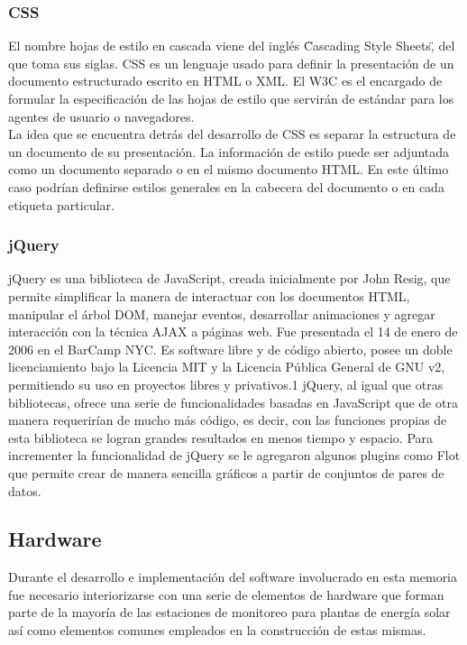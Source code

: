 \subsubsection{CSS}
El nombre hojas de estilo en cascada viene del inglés \"Cascading Style Sheets\", del que toma sus siglas. CSS es un lenguaje usado para definir la presentación de un documento estructurado escrito en HTML o XML. El W3C es el encargado de formular la especificación de las hojas de estilo que servirán de estándar para los agentes de usuario o navegadores.\\
La idea que se encuentra detrás del desarrollo de CSS es separar la estructura de un documento de su presentación. La información de estilo puede ser adjuntada como un documento separado o en el mismo documento HTML. En este último caso podrían definirse estilos generales en la cabecera del documento o en cada etiqueta particular.

\subsubsection{jQuery}
jQuery es una biblioteca de JavaScript, creada inicialmente por John Resig, que permite simplificar la manera de interactuar con los documentos HTML, manipular el árbol DOM, manejar eventos, desarrollar animaciones y agregar interacción con la técnica AJAX a páginas web. Fue presentada el 14 de enero de 2006 en el BarCamp NYC. Es software libre y de código abierto, posee un doble licenciamiento bajo la Licencia MIT\cite{licencia:mit} y la Licencia Pública General de GNU v2\cite{licencia:gnu}, permitiendo su uso en proyectos libres y privativos.1 jQuery, al igual que otras bibliotecas, ofrece una serie de funcionalidades basadas en JavaScript que de otra manera requerirían de mucho más código, es decir, con las funciones propias de esta biblioteca se logran grandes resultados en menos tiempo y espacio.
Para incrementer la funcionalidad de jQuery se le agregaron algunos plugins como Flot que permite crear de manera sencilla gráficos a partir de conjuntos de pares de datos.

\subsection{Hardware}
Durante el desarrollo e implementación del software involucrado en esta memoria fue necesario interiorizarse con una serie de elementos de hardware que forman parte de la mayoría de las estaciones de monitoreo para plantas de energía solar así como elementos comunes empleados en la construcción de estas mismas.\\


